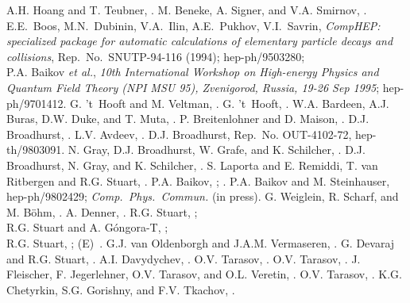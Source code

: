 A.H. Hoang and T. Teubner, .
  M. Beneke, A. Signer, and V.A. Smirnov, .
 E.E.~Boos, M.N.~Dubinin, V.A.~Ilin, A.E.~Pukhov,
  V.I.~Savrin, {\it CompHEP: specialized package for automatic
    calculations of elementary particle decays and collisions},
  Rep.~No.~SNUTP-94-116 (1994); hep-ph/9503280;\\
  P.A. Baikov {\it et al.}, {\it 10th International
    Workshop on High-energy Physics and Quantum Field Theory (NPI MSU
    95), Zvenigorod, Russia, 19-26 Sep 1995}; hep-ph/9701412.
  G. 't~Hooft and M. Veltman, .
  G. 't~Hooft, .
  W.A. Bardeen, A.J. Buras, D.W. Duke, and T. Muta,
  .
  P. Breitenlohner and D. Maison, .
  D.J. Broadhurst, .
  L.V. Avdeev, .
  D.J. Broadhurst, Rep.~No. OUT-4102-72, hep-th/9803091.
  N. Gray, D.J. Broadhurst, W. Grafe, and K. Schilcher,
  .
  D.J. Broadhurst, N. Gray, and K. Schilcher,
  .
  S. Laporta and E. Remiddi, 
  T. van Ritbergen and R.G. Stuart, .
  P.A. Baikov, ;
  .
 P.A. Baikov and M. Steinhauser, hep-ph/9802429; {\it
    Comp.\ Phys.\ Commun.} (in press).
  G. Weiglein, R. Scharf, and M. B\"ohm, .
  A. Denner, .
  R.G. Stuart, ;\\
  R.G. Stuart and A. G\'ongora-T, ;\\
  R.G. Stuart, ; (E)~.
  G.J. van Oldenborgh and J.A.M. Vermaseren, .
  G. Devaraj and R.G. Stuart, .
  A.I. Davydychev, .
  O.V. Tarasov, .
  O.V. Tarasov, .
  J. Fleischer, F. Jegerlehner, O.V. Tarasov, and O.L. Veretin,
  .
  O.V. Tarasov, .
  K.G. Chetyrkin, S.G. Gorishny, and F.V. Tkachov, .
